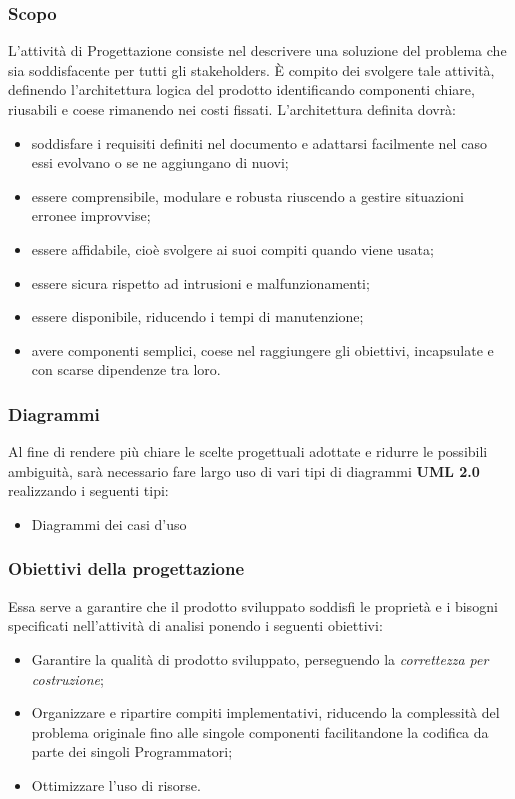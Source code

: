 \documentclass[NormeDiProgetto.tex]{subfiles}
\begin{document}
\subsubsection{Scopo}
L’attività di Progettazione consiste nel descrivere una soluzione del problema
che sia soddisfacente per tutti gli stakeholders.
\`{E} compito dei \progi svolgere tale attività, definendo l’architettura logica
del prodotto identificando componenti chiare, riusabili e coese rimanendo nei
costi fissati. L’architettura definita dovrà:
\begin{itemize}
	\item soddisfare i requisiti definiti nel documento \adr e adattarsi facilmente nel caso essi evolvano o se ne aggiungano di nuovi; 
	\item essere comprensibile, modulare e robusta riuscendo a gestire situazioni erronee improvvise;
	\item essere affidabile, cioè svolgere ai suoi compiti quando viene usata;
	\item essere sicura rispetto ad intrusioni e malfunzionamenti;
	\item essere disponibile, riducendo i tempi di manutenzione;
	\item avere componenti semplici, coese nel raggiungere gli obiettivi, incapsulate e con scarse dipendenze tra loro.
\end{itemize}

\subsubsection{Diagrammi}
Al fine di rendere più chiare le scelte progettuali adottate e
ridurre le possibili ambiguità, sarà necessario fare largo uso di vari tipi di diagrammi 
\textbf{UML 2.0} realizzando i seguenti tipi:
\begin{itemize}
	\item Diagrammi dei casi d'uso
\end{itemize}

\subsubsection{Obiettivi della progettazione}
Essa serve a garantire che il prodotto sviluppato soddisfi le proprietà e i bisogni specificati nell’attività di analisi ponendo i seguenti obiettivi:
\begin{itemize}
	\item Garantire la qualità di prodotto sviluppato, perseguendo la \textit{correttezza
		per costruzione};
	\item Organizzare e ripartire compiti implementativi, riducendo la
	complessità del problema originale fino alle singole componenti
	facilitandone la codifica da parte dei singoli Programmatori;
	\item Ottimizzare l’uso di risorse.
\end{itemize}
\end{document}
